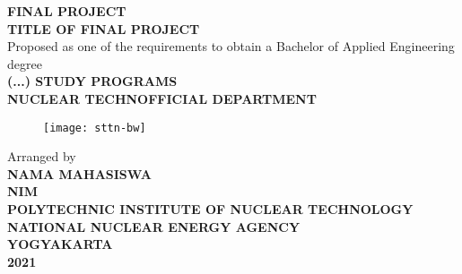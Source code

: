 \begin{titlepage}
	\thispagestyle{plain}
	\begingroup
	\begin{center}
		\singlespacing
		\textbf{FINAL PROJECT}\\
		\fontsize{14pt}{1.5em}\selectfont
		\textbf{TITLE OF FINAL PROJECT}\\[2cm]
		\fontsize{12pt}{1em}\selectfont
		Proposed as one of the requirements to obtain a Bachelor of Applied Engineering degree\\[2cm]
		\fontsize{12pt}{1em}\selectfont
		\textbf{(...) STUDY PROGRAMS}\\
		\textbf{NUCLEAR TECHNOFFICIAL DEPARTMENT}\\[2cm]
		
		\begin{figure}[h]
			\centering
			\texttt{[image: sttn-bw]}
		\end{figure}
		\vspace{2cm}
		
		Arranged by\\
		\textbf{NAMA MAHASISWA\\NIM}\\[2cm]
		
		\textbf{POLYTECHNIC INSTITUTE OF NUCLEAR TECHNOLOGY\\NATIONAL NUCLEAR ENERGY AGENCY\\YOGYAKARTA\\2021}
	\end{center}
	\endgroup
\end{titlepage}